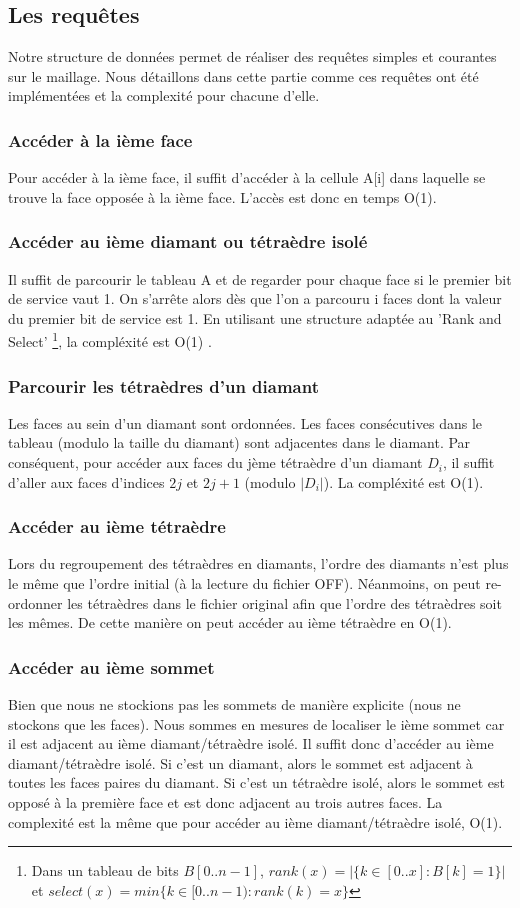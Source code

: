\subsection{Les requêtes}
\noindent
Notre structure de données permet de réaliser des requêtes simples et courantes sur le maillage. Nous détaillons dans cette partie comme ces requêtes ont été implémentées et la complexité pour chacune d'elle.
\subsubsection{Accéder à la ième face}
\noindent
Pour accéder à la ième face, il suffit d'accéder à la cellule A[i] dans laquelle se trouve la face opposée à la ième face. L'accès est donc en temps O(1).
\subsubsection{Accéder au ième diamant ou tétraèdre isolé}
\noindent
Il suffit de parcourir le tableau A et de regarder pour chaque face si le premier bit de service vaut 1. On s'arrête alors dès que l'on a parcouru i faces dont la valeur du premier bit de service est 1. En utilisant une structure adaptée au 'Rank and Select' \footnote{Dans un tableau de bits $B[0..n-1]$, $rank(x) = |\{k\in [0..x] : B[k]=1\}|$ et $select(x)=min\{k\in [0..n-1) : rank(k)=x\}$}, la compléxité est O(1) \cite{rank_and_select}.
\subsubsection{Parcourir les tétraèdres d'un diamant}
\noindent
Les faces au sein d'un diamant sont ordonnées. Les faces consécutives dans le tableau (modulo la taille du diamant) sont adjacentes dans le diamant. Par conséquent, pour accéder aux faces du jème tétraèdre d'un diamant $D_i$, il suffit d'aller aux faces d'indices $2j$ et $2j+1$ (modulo $|D_i|$). La compléxité est O(1).
\subsubsection{Accéder au ième tétraèdre}
\noindent
Lors du regroupement des tétraèdres en diamants, l'ordre des diamants n'est plus le même que l'ordre initial (à la lecture du fichier OFF). Néanmoins, on peut re-ordonner les tétraèdres dans le fichier original afin que l'ordre des tétraèdres soit les mêmes. De cette manière on peut accéder au ième tétraèdre en O(1).
\subsubsection{Accéder au ième sommet}
\noindent
Bien que nous ne stockions pas les sommets de manière explicite (nous ne stockons que les faces). Nous sommes en mesures de localiser le ième sommet car il est adjacent au ième diamant/tétraèdre isolé.
Il suffit donc d'accéder au ième diamant/tétraèdre isolé. Si c'est un diamant, alors le sommet est adjacent à toutes les faces paires du diamant. Si c'est un tétraèdre isolé, alors le sommet est opposé à la première face et est donc adjacent au trois autres faces. La complexité est la même que pour accéder au ième diamant/tétraèdre isolé, O(1).
